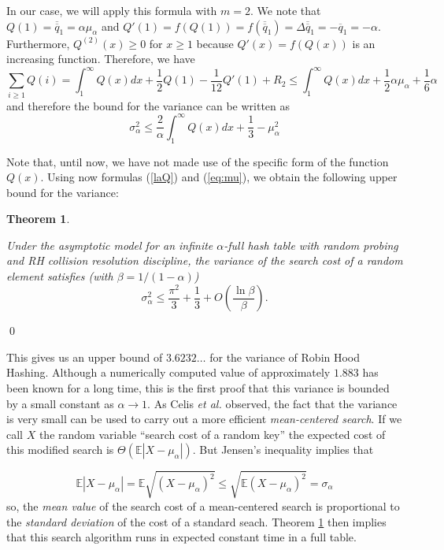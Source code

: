 \documentclass[proceedings]{aofa}
\newtheorem{theorem}{Theorem}
\newcommand{\tail}[1]{\overline{#1}}
\newcommand{\ttail}[1]{\tail{\tail{#1}}}
\begin{document}
In our case, we will apply this formula with $m=2$.
We note that
$Q(1)=\ttail{q}_1=\alpha\mu_{\alpha}$ and
$Q'(1)=f(Q(1))=f(\ttail{q}_1)=\Delta\ttail{q}_1=-\tail{q}_1=-\alpha$.
Furthermore, $Q^{(2)}(x)\ge 0$ for $x\ge 1$ because $Q'(x)=f(Q(x))$ is an increasing function. Therefore, we have
\begin{equation}
\sum_{i\ge 1} Q(i) = \int_1^{\infty} Q(x)dx +\frac12 Q(1)-\frac{1}{12} Q'(1)+R_2
\le  \int_1^{\infty} Q(x)dx + \frac12 \alpha\mu_{\alpha} + \frac16 \alpha
\end{equation}
and therefore the bound for the variance can be written as
 \begin{equation}\label{eq:boundtailV2}
\sigma_{\alpha}^2 
\le \frac{2}{\alpha}  \int_1^{\infty} Q(x)dx  + \frac{1}{3}  - \mu_{\alpha}^2
\end{equation}

Note that, until now, we have not made use of the specific form of the function $Q(x)$.
Using now formulas (\ref{laQ}) and (\ref{eq:mu}), we obtain the following upper bound for the variance:
\begin{theorem}\label{theorem:boundRH}

Under the asymptotic model for an infinite $\alpha$-full hash table with random
probing and RH collision resolution discipline, the variance of the search cost
of a random element satisfies (with $\beta = 1/(1-\alpha)$)
\begin{equation}
\sigma^2_{\alpha}\le \frac{\pi^2}{3} + \frac13 +
O\left(\frac{\ln{\beta}}{\beta}\right).
\end{equation}
\end{theorem}
\qed

This gives us an upper bound of $3.6232\ldots$ for the variance of Robin Hood Hashing.
Although a numerically computed value of approximately $1.883$ has been known for a long time, this is the first proof that this variance is bounded by a small constant as $\alpha \rightarrow 1$.
As Celis {\em et al.} observed, the fact that the variance is very small can be used to carry out a more efficient {\em mean-centered search}. If we call $X$ the random variable
``search cost of a random key''
the expected cost of this modified 
search is 
$\Theta( \mathbb{E} |X-\mu_{\alpha}|)$. But Jensen's inequality implies that

\begin{equation}
\mathbb{E} |X-\mu_{\alpha}| =
    \mathbb{E} \sqrt{(X-\mu_{\alpha})^2} \le
        \sqrt{\mathbb{E}(X-\mu_{\alpha})^2} =
             \sigma_{\alpha}
\end{equation}
so, the {\em mean value} of the search cost of a mean-centered search is proportional to the {\em standard deviation} of the cost of a standard seach.
Theorem
\ref{theorem:boundRH} then implies that this search
algorithm runs in expected constant time in a full table.
\end{document}
